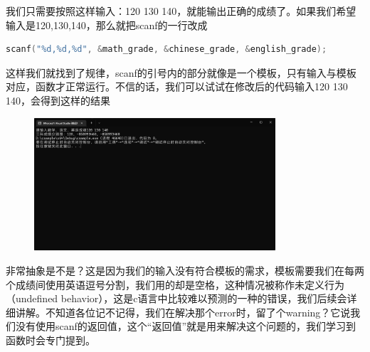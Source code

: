 我们只需要按照这样输入：120 130 140，就能输出正确的成绩了。如果我们希望输入是120,130,140，那么就把scanf的一行改成

\begin{lstlisting}[language=C]
    scanf("%d,%d,%d", &math_grade, &chinese_grade, &english_grade);
\end{lstlisting}

这样我们就找到了规律，scanf的引号内的部分就像是一个模板，只有输入与模板对应，函数才正常运行。不信的话，我们可以试试在修改后的代码输入120 130 140，会得到这样的结果

\begin{figure}[ht]
    \centering
    \includegraphics[width=0.8\textwidth, height=0.3\textheight]{images/1scanf出错.png}
\end{figure}

非常抽象是不是？这是因为我们的输入没有符合模板的需求，模板需要我们在每两个成绩间使用英语逗号分割，我们用的却是空格，这种情况被称作未定义行为（undefined behavior），这是c语言中比较难以预测的一种的错误，我们后续会详细讲解。不知道各位记不记得，我们在解决那个error时，留了个warning？它说我们没有使用scanf的返回值，这个“返回值”就是用来解决这个问题的，我们学习到函数时会专门提到。
